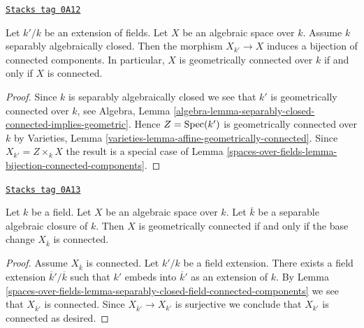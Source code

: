 \begin{lemma}
\label{spaces-over-fields-lemma-separably-closed-field-connected-components}
\href{https://stacks.math.columbia.edu/tag/0A12}{\texttt{Stacks tag 0A12}}

Let $k'/k$ be an extension of fields. Let $X$ be an algebraic space
over $k$. Assume $k$ separably algebraically closed. Then the morphism
$X_{k'} \to X$ induces a bijection of connected components. In particular,
$X$ is geometrically connected over $k$ if and only if $X$ is connected.
\end{lemma}

\begin{proof}
Since $k$ is separably algebraically closed we see that
$k'$ is geometrically connected over $k$, see
Algebra,
Lemma \ref{algebra-lemma-separably-closed-connected-implies-geometric}.
Hence $Z = \operatorname{Spec}(k')$ is geometrically connected over $k$ by
Varieties, Lemma \ref{varieties-lemma-affine-geometrically-connected}.
Since $X_{k'} = Z \times_k X$ the result is a special case of
Lemma \ref{spaces-over-fields-lemma-bijection-connected-components}.
\end{proof}

\begin{lemma}
\label{spaces-over-fields-lemma-characterize-geometrically-connected}
\href{https://stacks.math.columbia.edu/tag/0A13}{\texttt{Stacks tag 0A13}}

Let $k$ be a field. Let $X$ be an algebraic space over $k$.
Let $\overline{k}$ be a separable algebraic closure of $k$.
Then $X$ is geometrically connected if and only if the base change
$X_{\overline{k}}$ is connected.
\end{lemma}

\begin{proof}
Assume $X_{\overline{k}}$ is connected. Let $k'/k$ be a field
extension. There exists a field extension $\overline{k}'/\overline{k}$
such that $k'$ embeds into $\overline{k}'$ as an extension of $k$.
By Lemma \ref{spaces-over-fields-lemma-separably-closed-field-connected-components}
we see that $X_{\overline{k}'}$ is connected.
Since $X_{\overline{k}'} \to X_{k'}$ is surjective we conclude
that $X_{k'}$ is connected as desired.
\end{proof}

